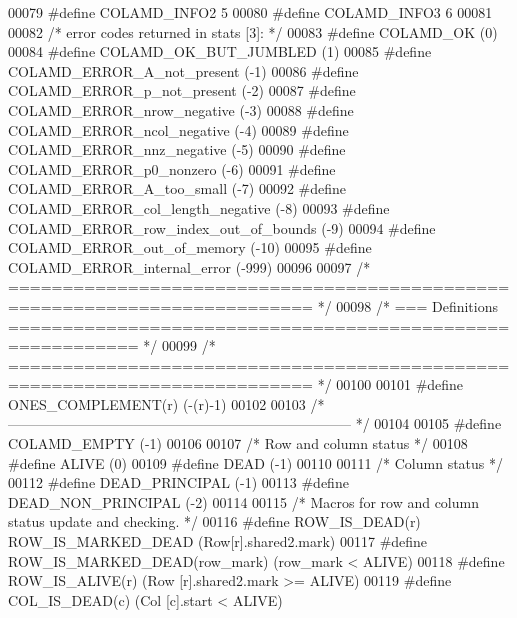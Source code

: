 \begin{DoxyCode}
00079 \textcolor{preprocessor}{#define COLAMD\_INFO2 5}
00080 \textcolor{preprocessor}{#define COLAMD\_INFO3 6}
00081 
00082 \textcolor{comment}{/* error codes returned in stats [3]: */}
00083 \textcolor{preprocessor}{#define COLAMD\_OK       (0)}
00084 \textcolor{preprocessor}{#define COLAMD\_OK\_BUT\_JUMBLED     (1)}
00085 \textcolor{preprocessor}{#define COLAMD\_ERROR\_A\_not\_present    (-1)}
00086 \textcolor{preprocessor}{#define COLAMD\_ERROR\_p\_not\_present    (-2)}
00087 \textcolor{preprocessor}{#define COLAMD\_ERROR\_nrow\_negative    (-3)}
00088 \textcolor{preprocessor}{#define COLAMD\_ERROR\_ncol\_negative    (-4)}
00089 \textcolor{preprocessor}{#define COLAMD\_ERROR\_nnz\_negative   (-5)}
00090 \textcolor{preprocessor}{#define COLAMD\_ERROR\_p0\_nonzero     (-6)}
00091 \textcolor{preprocessor}{#define COLAMD\_ERROR\_A\_too\_small    (-7)}
00092 \textcolor{preprocessor}{#define COLAMD\_ERROR\_col\_length\_negative  (-8)}
00093 \textcolor{preprocessor}{#define COLAMD\_ERROR\_row\_index\_out\_of\_bounds  (-9)}
00094 \textcolor{preprocessor}{#define COLAMD\_ERROR\_out\_of\_memory    (-10)}
00095 \textcolor{preprocessor}{#define COLAMD\_ERROR\_internal\_error   (-999)}
00096 
00097 \textcolor{comment}{/* ========================================================================== */}
00098 \textcolor{comment}{/* === Definitions ========================================================== */}
00099 \textcolor{comment}{/* ========================================================================== */}
00100 
00101 \textcolor{preprocessor}{#define ONES\_COMPLEMENT(r) (-(r)-1)}
00102 
00103 \textcolor{comment}{/* -------------------------------------------------------------------------- */}
00104 
00105 \textcolor{preprocessor}{#define COLAMD\_EMPTY (-1)}
00106 
00107 \textcolor{comment}{/* Row and column status */}
00108 \textcolor{preprocessor}{#define ALIVE (0)}
00109 \textcolor{preprocessor}{#define DEAD  (-1)}
00110 
00111 \textcolor{comment}{/* Column status */}
00112 \textcolor{preprocessor}{#define DEAD\_PRINCIPAL    (-1)}
00113 \textcolor{preprocessor}{#define DEAD\_NON\_PRINCIPAL  (-2)}
00114 
00115 \textcolor{comment}{/* Macros for row and column status update and checking. */}
00116 \textcolor{preprocessor}{#define ROW\_IS\_DEAD(r)      ROW\_IS\_MARKED\_DEAD (Row[r].shared2.mark)}
00117 \textcolor{preprocessor}{#define ROW\_IS\_MARKED\_DEAD(row\_mark)  (row\_mark < ALIVE)}
00118 \textcolor{preprocessor}{#define ROW\_IS\_ALIVE(r)     (Row [r].shared2.mark >= ALIVE)}
00119 \textcolor{preprocessor}{#define COL\_IS\_DEAD(c)      (Col [c].start < ALIVE)}

\end{DoxyCode}
